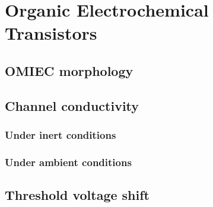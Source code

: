 \section{Organic Electrochemical Transistors}
\subsection{OMIEC morphology}

\subsection{Channel conductivity}


\subsubsection{Under inert conditions}

\subsubsection{Under ambient conditions}

\subsection{Threshold voltage shift}





